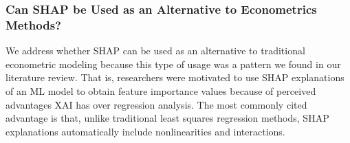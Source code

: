 \documentclass[mnsc,blindrev]{informs3}
\begin{document}
       
        

\subsubsection{Can SHAP be Used as an Alternative to Econometrics Methods?}
    We address whether SHAP can be used as an alternative to traditional econometric modeling because this type of usage was a pattern we found in our literature review. That is, researchers were motivated to use SHAP explanations of an ML model to obtain feature importance values because of perceived advantages XAI has over regression analysis. The most commonly cited advantage is that, unlike traditional least squares regression methods, SHAP explanations automatically include nonlinearities and interactions. 
    
\end{document}
